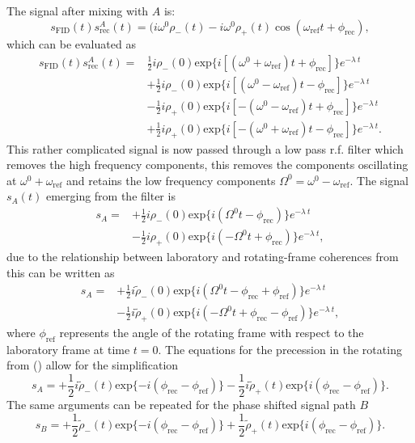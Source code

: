 The signal after mixing with $A$ is:
\begin{equation}
  s_\text{FID}(t)s_\text{rec}^A(t) = (i\omega^0\rho_-(t) - i\omega^0\rho_+(t)\cos(\omega_\text{ref}t + \phi_\text{rec}),
\end{equation}
which can be evaluated as
\begin{align}
  s_{\text{FID}}(t)s_{\text{rec}}^A(t) =& \frac{1}{2}i\rho_-(0)\text{exp}\{i[(\omega^0 + \omega_{\text{ref}})t + \phi_{\text{rec}}]\}e^{-\lambda~t}\\
                                        &+\frac{1}{2}i\rho_-(0)\text{exp}\{i[(\omega^0 - \omega_{\text{ref}})t - \phi_{\text{rec}}]\}e^{-\lambda~t}\\
                                        &-\frac{1}{2}i\rho_+(0)\text{exp}\{i[-(\omega^0 - \omega_{\text{ref}})t + \phi_{\text{rec}}]\}e^{-\lambda~t}\\
                                        &+\frac{1}{2}i\rho_+(0)\text{exp}\{i[-(\omega^0 + \omega_{\text{ref}})t - \phi_{\text{rec}}]\}e^{-\lambda~t}.
\end{align}
This rather complicated signal is now passed through a low pass r.f. filter which removes the high frequency components, this
removes the components oscillating at $\omega^0 + \omega_{\text{ref}}$ and retains the low frequency components
$\Omega^0 = \omega^0 - \omega_{\text{ref}}$. The signal $s_A(t)$ emerging from the filter is
\begin{align}
  s_A =& +\frac{1}{2}i\rho_-(0)\text{exp}\{i(\Omega^0t - \phi_{\text{rec}})\}e^{-\lambda~t}\\
       & -\frac{1}{2}i\rho_+(0)\text{exp}\{i(-\Omega^0t+ \phi_{\text{rec}})\}e^{-\lambda~t},
\end{align}
due to the relationship between laboratory and rotating-frame coherences from 
this can be written as
\begin{align}
  s_A =& +\frac{1}{2}i\tilde{\rho}_-(0)\text{exp}\{i(\Omega^0t - \phi_{\text{rec}} + \phi_{\text{ref}})\}e^{-\lambda~t}\\
       & -\frac{1}{2}i\tilde{\rho}_+(0)\text{exp}\{i(-\Omega^0t+ \phi_{\text{rec}} - \phi_{\text{ref}})\}e^{-\lambda~t},
\end{align}
where $\phi_{\text{ref}}$ represents the angle of the rotating frame with respect to the laboratory frame
at time $t = 0$. The equations for the precession in the rotating from ()
allow for the simplification
\begin{equation}
  s_A = +\frac{1}{2}i\tilde{\rho}_-(t)\text{exp}\{-i(\phi_{\text{rec}} - \phi_{\text{ref}})\}
        -\frac{1}{2}i\tilde{\rho}_+(t)\text{exp}\{i(\phi_{\text{rec}} - \phi_{\text{ref}})\}.
\end{equation}
The same arguments can be repeated for the phase shifted signal path $B$
\begin{equation}
  s_B = +\frac{1}{2}\tilde{\rho}_-(t)\text{exp}\{-i(\phi_{\text{rec}} - \phi_{\text{ref}})\}
        +\frac{1}{2}\tilde{\rho}_+(t)\text{exp}\{i(\phi_{\text{rec}} - \phi_{\text{ref}})\}.
\end{equation}

